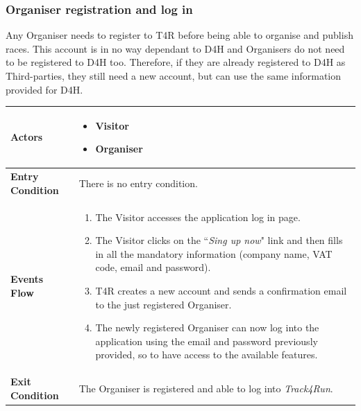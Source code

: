        \subsubsection{Organiser registration and log in}
            Any Organiser needs to register to T4R before being able to organise and publish races. This account is in no way dependant to D4H and Organisers do not need to be registered to D4H too. Therefore, if they are already registered to D4H as Third-parties, they still need a new account, but can use the same information provided for D4H. 
            
            \begin{table}[H]
            	\centering
                
                \begin{tabular}{|p{3cm}|p{8.2cm}|}
                    \hline
                    \textbf{Actors} & \begin{itemize}
                        \item Visitor
                        \item Organiser
                    \end{itemize} \\
                     \hline
                    \textbf{Entry Condition} & There is no entry condition. \\
                     \hline
                    \textbf{Events Flow} & \begin{enumerate}
                                               \item The Visitor accesses the application log in page.
                                               \item The Visitor clicks on the ``\emph{Sing up now}" link and then fills in all the mandatory information (company name, VAT code, email and password).
                                               \item T4R creates a new account and sends a confirmation email to the just registered Organiser.
                                               \item The newly registered Organiser can now log into the application using the email and password previously provided, so to have access to the available features.
                                           \end{enumerate} \\
                     \hline
                    \textbf{Exit Condition} & The Organiser is registered and able to log into                                \emph{Track4Run}. \\

\end{tabular}
\end{table}
